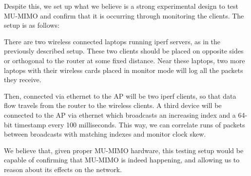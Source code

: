 Despite this, we set up what we believe is a strong experimental design to test
MU-MIMO and confirm that it is occurring through monitoring the clients. The
setup is as follows:

There are two wireless connected laptops running iperf servers, as in the
previously described setup. These two clients should be placed on opposite sides
or orthogonal to the router at some fixed distance. Near these laptops, two more
laptops with their wireless cards placed in monitor mode will log all the
packets they receive.

Then, connected via ethernet to the AP will be two iperf clients, so that data
flow travels from the router to the wireless clients. A third device will be
connected to the AP via ethernet which broadcasts an increasing index and a
64-bit timestamp every 100 milliseconds. This way, we can correlate runs of
packets between broadcasts with matching indexes and monitor clock skew.

We believe that, given proper MU-MIMO hardware, this testing setup would be
capable of confirming that MU-MIMO is indeed happening, and allowing us to
reason about its effects on the network.

